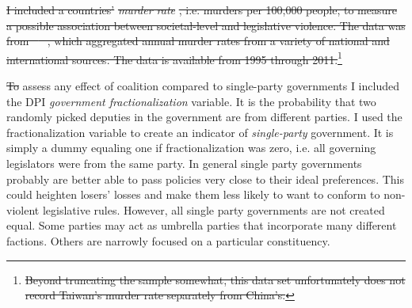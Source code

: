 \documentclass[a4paper]{article}\usepackage[]{graphicx}\usepackage[]{color}
\providecommand{\DIFaddtex}[1]{{\protect\color{blue}\uwave{#1}}} %
\providecommand{\DIFdeltex}[1]{{\protect\color{red}\sout{#1}}}                      %
\providecommand{\DIFaddbegin}{} %
\providecommand{\DIFaddend}{} %
\providecommand{\DIFdelend}{} %
\providecommand{\DIFadd}[1]{\texorpdfstring{\DIFaddtex{#1}}{#1}} %
\providecommand{\DIFdel}[1]{\texorpdfstring{\DIFdeltex{#1}}{}} %
\begin{document}
\DIFdel{I included a countries' }\emph{\DIFdel{murder rate}}%
\DIFdel{, i.e. murders per 100,000 people, to measure a possible association between societal-level and legislative violence. The data was from \mbox{%
\cite{UNMurder2013}
}%
, which aggregated annual murder rates from a variety of national and international sources. The data is available from 1995 through 2011.}\footnote{\DIFdel{Beyond truncating the sample somewhat, this data set unfortunately does not record Taiwan's murder rate separately from China's.}}
\addtocounter{footnote}{-1}%

\DIFdel{To }\DIFdelend assess any effect of coalition compared to single-party governments I included \DIFaddbegin \DIFadd{a transformation of }\DIFaddend the DPI {\emph{government fractionalization}} variable. It is the probability that two randomly picked deputies in the government are from different parties. I used the fractionalization variable to create an indicator of {\emph{single-party}} government. It is simply a dummy equaling one if fractionalization was zero, i.e. all governing legislators were from the same party. In general single party governments probably are better able to pass policies very close to their ideal preferences. This could heighten losers' losses and make them less likely to want to conform to non-violent legislative rules. However, all single party governments are not created equal. Some parties may act as umbrella parties that incorporate many different factions. Others are narrowly focused on a particular constituency.
\end{document}
